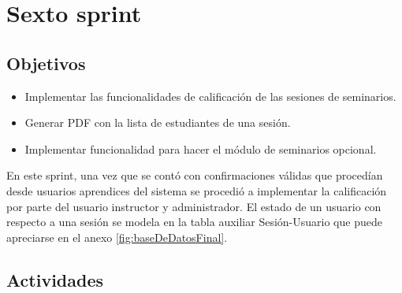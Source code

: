 \section{Sexto sprint} %
\label{sec:sexto_sprint}

\subsection{Objetivos}

\begin{itemize}
	\item Implementar las funcionalidades de calificación de las sesiones de seminarios.
	\item Generar \gls{PDF} con la lista de estudiantes de una sesión.
	\item Implementar funcionalidad para hacer el módulo de seminarios opcional.
\end{itemize}

En este sprint, una vez que se contó con confirmaciones válidas que procedían desde usuarios aprendices del sistema se procedió a implementar la calificación por parte del usuario instructor y administrador. El estado de un usuario con respecto a una sesión se modela en la tabla auxiliar Sesión-Usuario que puede apreciarse en el anexo \ref{fig:baseDeDatosFinal}.

\subsection{Actividades} %
\label{sub:actividades6}

